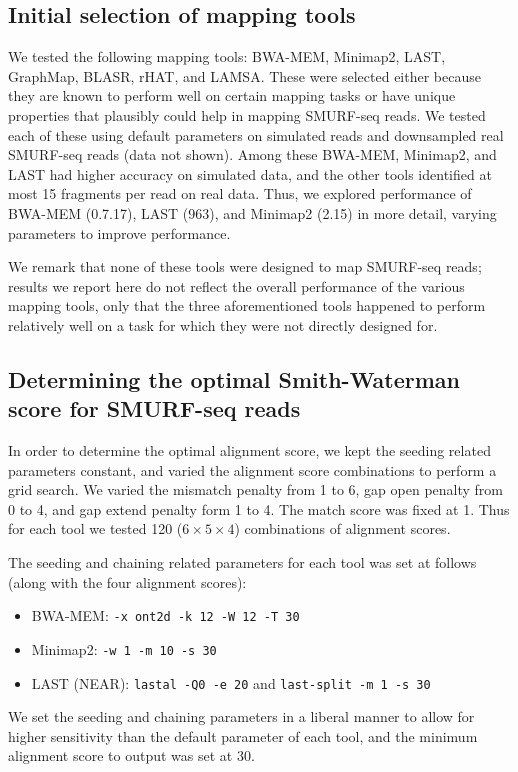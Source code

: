 \subsection{Initial selection of mapping tools}
We tested the following mapping tools: BWA-MEM\citep{li2013aligning},
Minimap2\citep{li2018minimap2}, LAST\citep{kielbasa2011adaptive},
GraphMap\citep{sovic2016fast}, BLASR\citep{chaisson2012mapping},
rHAT\citep{liu2015rhat}, and LAMSA\citep{liu2017lamsa}. These were
selected either because they are known to perform well on certain
mapping tasks or have unique properties that plausibly could help in
mapping SMURF-seq reads. We tested each of these using default
parameters on simulated reads and downsampled real SMURF-seq
reads (data not shown). Among these BWA-MEM, Minimap2, and LAST had
higher accuracy on simulated data, and the other tools identified at
most 15 fragments per read on real data. Thus, we explored performance
of BWA-MEM (0.7.17), LAST (963), and Minimap2 (2.15) in more detail,
varying parameters to improve performance.

We remark that none of these tools were designed to map SMURF-seq reads;
results we report here do not reflect the overall performance of the
various mapping tools, only that the three aforementioned tools happened
to perform relatively well on a task for which they were not directly
designed for.


\subsection{Determining the optimal Smith-Waterman score for
  SMURF-seq reads}
In order to determine the optimal alignment score, we kept the seeding
related parameters constant, and varied the alignment score combinations
to perform a grid search. We varied the mismatch penalty from 1 to 6,
gap open penalty from 0 to 4, and gap extend penalty form 1 to 4.  The
match score was fixed at 1. Thus for each tool we tested 120 ($6 \times
5 \times 4$) combinations of alignment scores.

The seeding and chaining related parameters for each tool was set at
follows (along with the four alignment scores):
\begin{itemize}
\item BWA-MEM: \texttt{-x ont2d -k 12 -W 12 -T 30}
\item Minimap2: \texttt{-w 1 -m 10 -s 30}
\item LAST (NEAR): \texttt{lastal -Q0 -e 20} and \texttt{last-split -m 1 -s 30}
\end{itemize}
We set the seeding and chaining parameters in a liberal manner to allow
for higher sensitivity than the default parameter of each tool, and
the minimum alignment score to output was set at 30.

